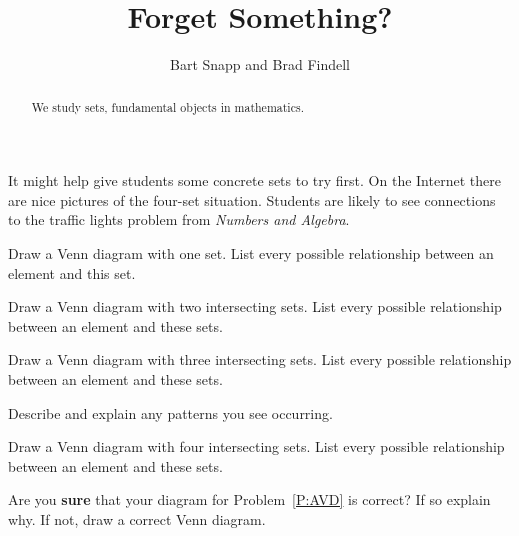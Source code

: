 \documentclass[nooutcomes]{ximera}
\title{Forget Something?}
\author{Bart Snapp and Brad Findell}
\begin{document}
\begin{abstract}
  We study sets, fundamental objects in mathematics.
\end{abstract}
\maketitle


\begin{teachingnote}
It might help give students some concrete sets to try first.  On the Internet there are nice pictures of the four-set situation. Students are likely to see connections to the traffic lights problem from \emph{Numbers and Algebra}.
\end{teachingnote}

\begin{problem} 
Draw a Venn diagram with one set. List every possible relationship
between an element and this set. 
\vfill
\end{problem}

\begin{problem} 
Draw a Venn diagram with two intersecting sets. List every possible
relationship between an element and these sets.
\vfill
\end{problem}


\begin{problem} 
Draw a Venn diagram with three intersecting sets. List every possible
relationship between an element and these sets.
\vfill
\end{problem}

\newpage
\begin{problem}
Describe and explain any patterns you see occurring.
\vfill
\end{problem}

\begin{problem}\label{P:AVD}
Draw a Venn diagram with four intersecting sets. List every possible
relationship between an element and these sets.
\vfill
\end{problem}

\begin{problem}
Are you \textbf{sure} that your diagram for Problem~\ref{P:AVD} is
correct? If so explain why. If not, draw a correct Venn diagram.
\vfill
\end{problem}
\end{document}
